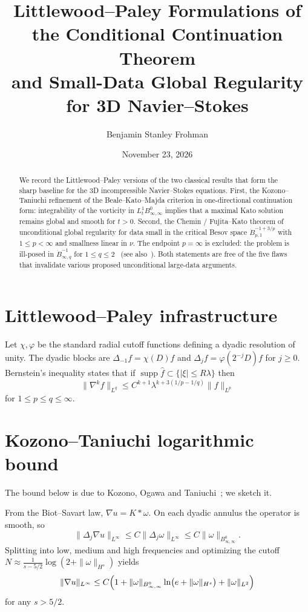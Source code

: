\documentclass[11pt,a4paper]{article}
\title{Littlewood--Paley Formulations of the Conditional Continuation Theorem\\and Small-Data Global Regularity for 3D Navier--Stokes}
\author{Benjamin Stanley Frohman}
\date{November 23, 2026}
\begin{document}
\maketitle
{}

\begin{abstract}
We record the Littlewood--Paley versions of the two classical results that form the sharp baseline for the 3D incompressible Navier--Stokes equations. First, the Kozono--Taniuchi refinement of the Beale--Kato--Majda criterion in one-directional continuation form: integrability of the vorticity in \(L^1_t B^0_{\infty,\infty}\) implies that a maximal Kato solution remains global and smooth for \(t>0\). Second, the Chemin / Fujita--Kato theorem of unconditional global regularity for data small in the critical Besov space \(\dot{B}^{-1+3/p}_{p,1}\) with \(1\le p<\infty\) and smallness linear in \(\nu\). The endpoint \(p=\infty\) is excluded: the problem is ill-posed in \(\dot B^{-1}_{\infty,q}\) for \(1\le q\le2\)~\cite{Wang2015} (see also~\cite{BourgainPavlovic2008}). Both statements are free of the five flaws that invalidate various proposed unconditional large-data arguments.
\end{abstract}

\section{Littlewood--Paley infrastructure}

Let \(\chi,\varphi\) be the standard radial cutoff functions defining a dyadic resolution of unity. The dyadic blocks are \(\Delta_{-1}f=\chi(D)f\) and \(\Delta_j f=\varphi(2^{-j}D)f\) for \(j\ge 0\). Bernstein's inequality states that if \(\operatorname{supp}\widehat{f}\subset\{|\xi|\le R\lambda\}\) then
\[
\|\nabla^k f\|_{L^q}\le C^{k+1}\lambda^{k+3(1/p-1/q)}\|f\|_{L^p}
\]
for \(1\le p\le q\le\infty\).

\section{Kozono--Taniuchi logarithmic bound}
The bound below is due to Kozono, Ogawa and Taniuchi~\cite{KOT2002}; we sketch it.

From the Biot--Savart law, \(\nabla u=K*\omega\). On each dyadic annulus the operator is smooth, so
\[
\|\Delta_j\nabla u\|_{L^\infty}\le C\|\Delta_j\omega\|_{L^\infty}\le C\|\omega\|_{B^0_{\infty,\infty}}.
\]
Splitting into low, medium and high frequencies and optimizing the cutoff \(N\approx\frac1{s-5/2}\log(2+\|\omega\|_{H^s})\) yields
\begin{equation}\label{eq:KT}
\|\nabla u\|_{L^\infty}
\le C\Bigl(1+\|\omega\|_{B^0_{\infty,\infty}}\ln\bigl(e+\|\omega\|_{H^s}\bigr)+\|\omega\|_{L^2}\Bigr)
\end{equation}
for any \(s>5/2\).
\end{document}
